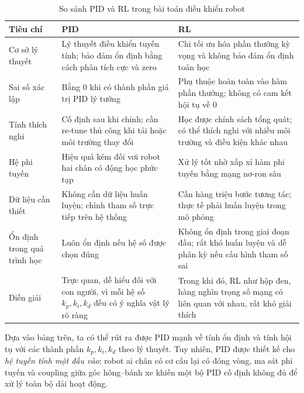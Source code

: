 \begin{table}[H]
    \centering
    \caption{So sánh PID và RL trong bài toán điều khiển robot}
    \label{tab:rl_vs_pid}
    \renewcommand{\arraystretch}{1.4}
    \begin{tabular}{|p{3.5cm}|p{5cm}|p{5cm}|}
    \hline
    \textbf{Tiêu chí} & \textbf{PID} & \textbf{RL} \\
    \hline
    Cơ sở lý thuyết
        & Lý thuyết điều khiển tuyến tính; bảo đảm ổn định bằng cách phân tích cực và zero
        & Chi tối ưu hóa phần thưởng kỳ vọng và không bảo đảm ổn định toán học \\
    \hline
    Sai số xác lập
        & Bằng 0 khi có thành phần giá trị PID lý tưởng
        & Phụ thuộc hoàn toàn vào hàm phần thưởng; không có cam kết hội tụ về 0 \\
    \hline
    Tính thích nghi
        & Cố định sau khi chỉnh; cần re-tune thủ công khi tải hoặc môi trường thay đổi
        & Học được chính sách tổng quát; có thể thích nghi với nhiều môi trường và điều kiện khác nhau \\
    \hline
    Hệ phi tuyến
        & Hiệu quả kém đối vơi robot hai chân có động học phức tạp
        & Xử lý tốt nhờ xấp xỉ hàm phi tuyến bằng mạng nơ-ron sâu \\
    \hline
    Dữ liệu cần thiết
        & Không cần dữ liệu huấn luyện; chỉnh tham số trực tiếp trên hệ thống
        & Cần hàng triệu bước tương tác; thực tế phải huấn luyện trong mô phỏng \\
    \hline
    Ổn định trong quá trình học
        & Luôn ổn định nếu hệ số được chọn đúng
        & Không ổn định trong giai đoạn đầu; rất khó huấn luyện và dễ phân kỳ nếu cấu hình tham số sai \\
    \hline
    Diễn giải
        & Trực quan, dễ hiểu đối với con người, vì mỗi hệ số $k_p,k_i,k_d$ đều có ý nghĩa vật lý rõ ràng
        & Trong khi đó, RL như hộp đen, hàng nghìn trọng số mạng có liên quan với nhau, rất khó giải thích \\
    \hline
    \end{tabular}
\end{table}



Dựa vào bảng trên, ta có thể rút ra được PID mạnh về tính ổn định và tính 
hội tụ với các thành phần $k_p, k_i, k_d$ theo lý thuyết. 
Tuy nhiên, PID được thiết kế cho \textit{hệ tuyến tính một đầu vào};
robot ai chân có cơ cấu lại có đóng vòng, ma sát phi tuyến và coupling
giữa góc hông–bánh xe khiến một bộ PID cố định không đủ để xử lý toàn
bộ dải hoạt động.

